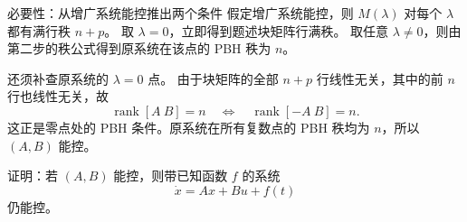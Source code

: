 \documentclass[11pt]{article}
\begin{document}
\begin{solution}
\begin{proofstep}{必要性：从增广系统能控推出两个条件}
假定增广系统能控，则 $M(\lambda)$ 对每个 $\lambda$ 都有满行秩 $n+p$。
取 $\lambda=0$，立即得到题述块矩阵行满秩。
取任意 $\lambda\ne0$，则由第二步的秩公式得到原系统在该点的 PBH 秩为 $n$。

还须补查原系统的 $\lambda=0$ 点。
由于块矩阵的全部 $n+p$ 行线性无关，其中的前 $n$ 行也线性无关，故
\[
\operatorname{rank}[A\ B]=n
\quad\Longleftrightarrow\quad
\operatorname{rank}[-A\ B]=n.
\]
这正是零点处的 PBH 条件。原系统在所有复数点的 PBH 秩均为 $n$，所以 $(A,B)$ 能控。
\end{proofstep}
\end{solution}

\begin{problem}[原题 15]
证明：若 $(A,B)$ 能控，则带已知函数 $f$ 的系统
\[
\dot x=Ax+Bu+f(t)
\]
仍能控。
\end{problem}
\end{document}
